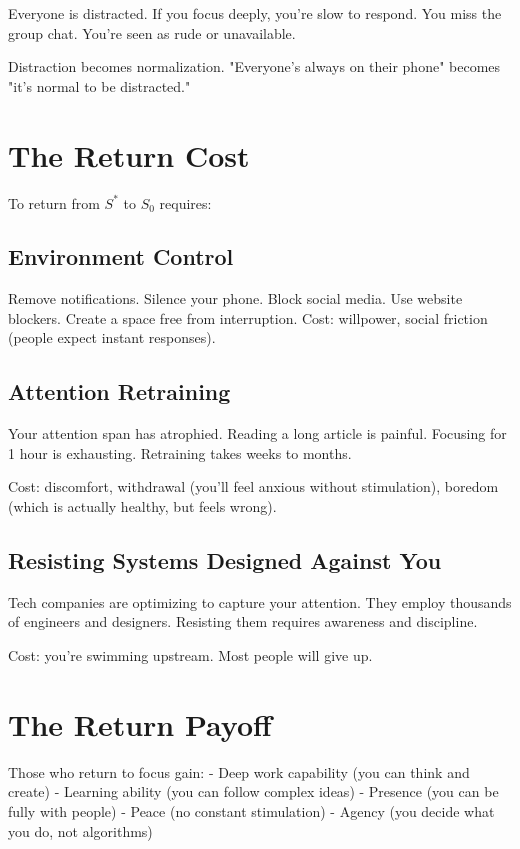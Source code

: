 \documentclass[12pt]{article}
\begin{document}
Everyone is distracted. If you focus deeply, you're slow to respond. You miss the group chat. You're seen as rude or unavailable.

Distraction becomes normalization. "Everyone's always on their phone" becomes "it's normal to be distracted."

\section{The Return Cost}

To return from $S^*$ to $S_0$ requires:

\subsection{Environment Control}

Remove notifications. Silence your phone. Block social media. Use website blockers. Create a space free from interruption. Cost: willpower, social friction (people expect instant responses).

\subsection{Attention Retraining}

Your attention span has atrophied. Reading a long article is painful. Focusing for 1 hour is exhausting. Retraining takes weeks to months.

Cost: discomfort, withdrawal (you'll feel anxious without stimulation), boredom (which is actually healthy, but feels wrong).

\subsection{Resisting Systems Designed Against You}

Tech companies are optimizing to capture your attention. They employ thousands of engineers and designers. Resisting them requires awareness and discipline.

Cost: you're swimming upstream. Most people will give up.

\section{The Return Payoff}

Those who return to focus gain:
- Deep work capability (you can think and create)
- Learning ability (you can follow complex ideas)
- Presence (you can be fully with people)
- Peace (no constant stimulation)
- Agency (you decide what you do, not algorithms)
\end{document}
